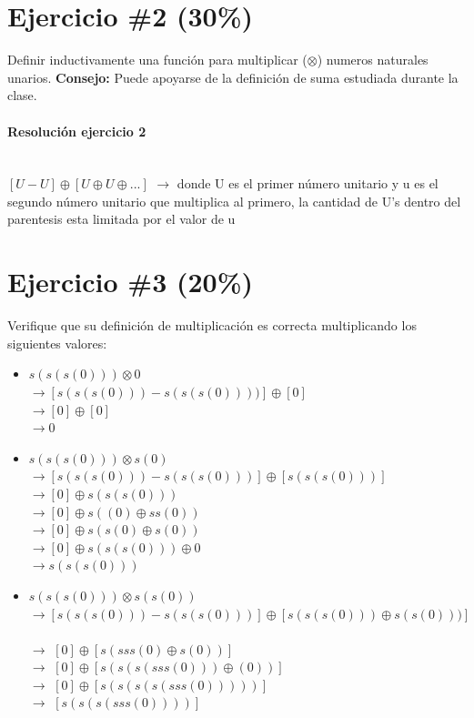 \documentclass{article}
\begin{document}
\section*{Ejercicio \#2 (30\%)}
Definir inductivamente una funci\'on para multiplicar ($\otimes$) numeros naturales unarios.
{\bf Consejo: }Puede apoyarse de la definici\'on de suma estudiada durante la
clase.
\paragraph{Resoluci\'on ejercicio 2}
\ \\ $[U-U] \oplus [U \oplus U \oplus ...]$ $\rightarrow$ donde U es el primer n\'umero unitario y u es el segundo n\'umero unitario que multiplica al primero, la cantidad de U's dentro del parentesis esta limitada por el valor de u
\section*{Ejercicio \#3 (20\%)}
Verifique que su definici\'on de multiplicaci\'on es correcta multiplicando los siguientes valores:
\begin{itemize}
	\item{$s(s(s(0)))\otimes 0$}
	\ \\ $\rightarrow$$[s(s(s(0))) - s(s(s(0))))] \oplus [0]$
	\ \\ $\rightarrow [0] \oplus [0]$
	\ \\ $\rightarrow$$0$
	\item{$s(s(s(0)))\otimes s(0)$}
	\ \\ $\rightarrow [s(s(s(0)))-s(s(s(0)))] \oplus [s(s(s(0)))]$
\ \\ $\rightarrow [0] \oplus s(s(s(0)))$
\ \\ $\rightarrow [0] \oplus s((0) \oplus ss(0))$
\ \\ $\rightarrow [0] \oplus s(s(0) \oplus s(0))$
\ \\ $\rightarrow [0] \oplus s(s(s(0))) \oplus 0 $
\ \\ $\rightarrow  s(s(s(0)))$
	\item{$s(s(s(0)))\otimes s(s(0))$}
\ \\ $\rightarrow [s(s(s(0)))-s(s(s(0)))] \oplus [s(s(s(0))) \oplus s(s(0)))]$
\ \\ $\rightarrow$ $[0] \oplus [s(sss(0) \oplus s(0))]$
\ \\ $\rightarrow$ $[0] \oplus [s(s(s(sss(0))) \oplus (0))]$
\ \\ $\rightarrow$ $[0] \oplus [s(s(s(s(sss(0)))))]$
\ \\ $\rightarrow$ $[s(s(s(sss(0))))]$
\end{itemize}
\end{document}
